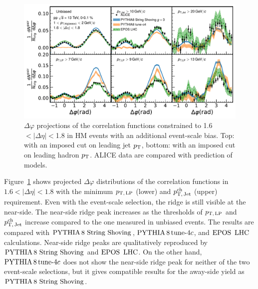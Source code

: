 \begin{figure}[h!]
	\centering
	\includegraphics[width=0.99\linewidth]{./figures/Fig5_PlotDeltaPhiESE.pdf}
	\caption{ $\Delta\varphi$ projections of the correlation functions constrained to 1.6$<|\Delta\eta|<$1.8 in HM events with an additional event-scale bias. Top: with an imposed cut on leading jet $p_\mathrm{T}$,  bottom: with an imposed cut on leading hadron $p_\mathrm{T}$. ALICE data are compared with prediction of models.}
	\label{fig:PlotDeltaPhiESE}
\end{figure}

Figure~\ref{fig:PlotDeltaPhiESE} shows projected $\Delta\varphi$ distributions of the correlation functions in $1.6<|\Delta\eta|<1.8$ with the minimum $p_\mathrm{T,\,LP}$ (lower) and $p_\mathrm{T,\,Jet}^\mathrm{ch}$ (upper) requirement. Even with the event-scale selection, the ridge is still visible at the near-side. The near-side ridge peak increases as the thresholds of $p_\mathrm{T,\,LP}$ and $p_\mathrm{T,\,Jet}^\mathrm{ch}$ increase compared to the one measured in unbiased events. The results are compared with ${\mathrm{PYTHIA}\,8~\mathrm{String}~}\mathrm{Shoving}$, $\mathrm{PYTHIA}\,8\,\mathrm{tune}{\text -}4c$, and ${\mathrm{EPOS}\,~\mathrm{LHC}}$ calculations. Near-side ridge peaks are qualitatively reproduced by ${\mathrm{PYTHIA}\,8~\mathrm{String}~}\mathrm{Shoving}$ and ${\mathrm{EPOS}\,~\mathrm{LHC}}$. On the other hand, $\mathrm{PYTHIA}\,8\,\mathrm{tune}{\text -}4c$ does not show the  near-side ridge peak for neither of the two event-scale selections, but it gives compatible results for the away-side yield as ${\mathrm{PYTHIA}\,8~\mathrm{String}~}\mathrm{Shoving}$.

